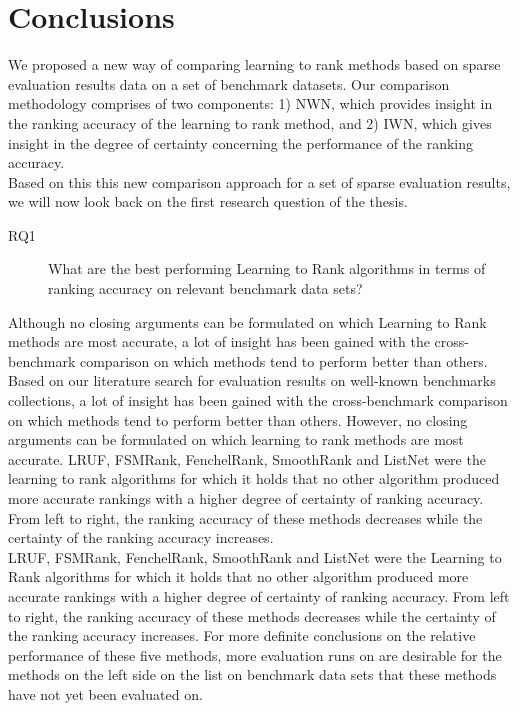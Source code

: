 \section{Conclusions}
We proposed a new way of comparing learning to rank methods based on sparse evaluation results data on a set of benchmark datasets. Our comparison methodology comprises of two components: 1) \ac{NWN}, which provides insight in the ranking accuracy of the learning to rank method, and 2) \ac{IWN}, which gives insight in the degree of certainty concerning the performance of the ranking accuracy.\\

Based on this this new comparison approach for a set of sparse evaluation results, we will now look back on the first research question of the thesis.
\begin{description}
\item[RQ1] What are the best performing Learning to Rank algorithms in terms of ranking accuracy on relevant benchmark data sets?\\
\end{description}
Although no closing arguments can be formulated on which Learning to Rank methods are most accurate, a lot of insight has been gained with the cross-benchmark comparison on which methods tend to perform better than others.\\

Based on our literature search for evaluation results on well-known benchmarks collections, a lot of insight has been gained with the cross-benchmark comparison on which methods tend to perform better than others. However, no closing arguments can be formulated on which learning to rank methods are most accurate. LRUF, FSMRank, FenchelRank, SmoothRank and ListNet were the learning to rank algorithms for which it holds that no other algorithm produced more accurate rankings with a higher degree of certainty of ranking accuracy. From left to right, the ranking accuracy of these methods decreases while the certainty of the ranking accuracy increases.\\

LRUF, FSMRank, FenchelRank, SmoothRank and ListNet were the Learning to Rank algorithms for which it holds that no other algorithm produced more accurate rankings with a higher degree of certainty of ranking accuracy. From left to right, the ranking accuracy of these methods decreases while the certainty of the ranking accuracy increases. For more definite conclusions on the relative performance of these five methods, more evaluation runs on are desirable for the methods on the left side on the list on benchmark data sets that these methods have not yet been evaluated on.\\

